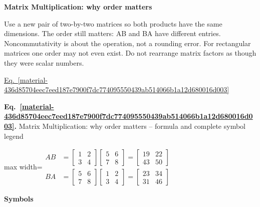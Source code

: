 \documentclass[11pt,a4paper]{article}
\begin{document}
\textbf{Matrix Multiplication: why order matters}


Use a new pair of two-by-two matrices so both products have the same dimensions. The order still matters: AB and BA have different entries. Noncommutativity is about the operation, not a rounding error. For rectangular matrices one order may not even exist. Do not rearrange matrix factors as though they were scalar numbers.


\hyperref[material-436d85704eec7eed187e7900f7dc774095550439ab514066b1a12d680016d003]{Eq.~\ref*{material-436d85704eec7eed187e7900f7dc774095550439ab514066b1a12d680016d003}}


\par\medskip
\noindent\begin{minipage}{\linewidth}
\label{material-436d85704eec7eed187e7900f7dc774095550439ab514066b1a12d680016d003}
\noindent\textbf{Eq.~\ref*{material-436d85704eec7eed187e7900f7dc774095550439ab514066b1a12d680016d003}.} Matrix Multiplication: why order matters – formula and complete symbol legend\par\nopagebreak
\begin{center}\begin{adjustbox}{max width=\linewidth}$\displaystyle \begin{aligned}AB&=\begin{bmatrix}1&2\\3&4\end{bmatrix}\begin{bmatrix}5&6\\7&8\end{bmatrix}=\begin{bmatrix}19&22\\43&50\end{bmatrix}\\BA&=\begin{bmatrix}5&6\\7&8\end{bmatrix}\begin{bmatrix}1&2\\3&4\end{bmatrix}=\begin{bmatrix}23&34\\31&46\end{bmatrix}\end{aligned}$\end{adjustbox}\end{center}

\par\noindent\textbf{Symbols}


\end{minipage}
\end{document}
